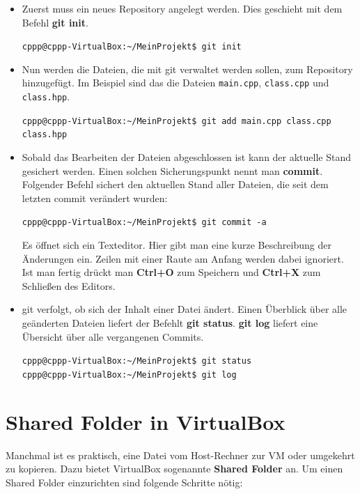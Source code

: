 \begin{itemize}
\item Zuerst muss ein neues Repository angelegt werden. Dies geschieht mit dem Befehl \textbf{git init}.

\texttt{cppp@cppp-VirtualBox:\textasciitilde/MeinProjekt\$ git init}

\item Nun werden die Dateien, die mit git verwaltet werden sollen, zum Repository hinzugefügt. Im Beispiel sind das die Dateien \texttt{main.cpp}, \texttt{class.cpp} und \texttt{class.hpp}.

\texttt{cppp@cppp-VirtualBox:\textasciitilde/MeinProjekt\$ git add main.cpp class.cpp class.hpp}

\item Sobald das Bearbeiten der Dateien abgeschlossen ist kann der aktuelle Stand gesichert werden. Einen solchen Sicherungspunkt nennt man \textbf{commit}. Folgender Befehl sichert den aktuellen Stand aller Dateien, die seit dem letzten commit verändert wurden:

\texttt{cppp@cppp-VirtualBox:\textasciitilde/MeinProjekt\$ git commit -a}

Es öffnet sich ein Texteditor. Hier gibt man eine kurze Beschreibung der Änderungen ein. Zeilen mit einer Raute am Anfang werden dabei ignoriert. Ist man fertig drückt man \textbf{Ctrl+O} zum Speichern und \textbf{Ctrl+X} zum Schließen des Editors.

\item git verfolgt, ob sich der Inhalt einer Datei ändert. Einen Überblick über alle geänderten Dateien liefert der Befehlt \textbf{git status}. \textbf{git log} liefert eine Übersicht über alle vergangenen Commits.

\texttt{cppp@cppp-VirtualBox:\textasciitilde/MeinProjekt\$ git status}\\
\texttt{cppp@cppp-VirtualBox:\textasciitilde/MeinProjekt\$ git log}

\end{itemize}

\section{Shared Folder in VirtualBox}

Manchmal ist es praktisch, eine Datei vom Host-Rechner zur VM oder umgekehrt zu kopieren. Dazu bietet VirtualBox sogenannte \textbf{Shared Folder} an. Um einen Shared Folder einzurichten sind folgende Schritte nötig:

